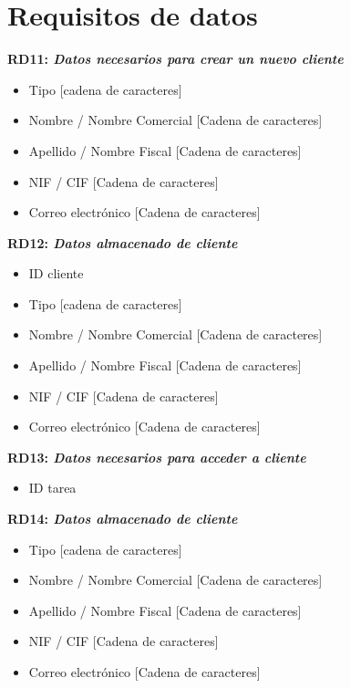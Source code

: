 \documentclass[paper=a4, fontsize=11pt, spanish]{scrartcl}
\begin{document}
\section{Requisitos de datos}
\setlength{\parindent}{0em}
\textbf{RD11: \textit{ Datos necesarios para crear un nuevo cliente}}
\setlength{\parindent}{2em}
\begin{itemize}

	\item Tipo [cadena de caracteres]
	
	\item Nombre / Nombre Comercial [Cadena de caracteres]
	
	\item Apellido / Nombre Fiscal [Cadena de caracteres]
	
	\item NIF / CIF [Cadena de caracteres]
	
	\item Correo electrónico [Cadena de caracteres]

\end{itemize}
\setlength{\parindent}{0em}
\textbf{RD12: \textit{Datos almacenado de cliente}}
\setlength{\parindent}{2em}
\begin{itemize}
	\item ID cliente
	
	\item Tipo [cadena de caracteres]
	
	\item Nombre / Nombre Comercial [Cadena de caracteres]
	
	\item Apellido / Nombre Fiscal [Cadena de caracteres]
	
	\item NIF / CIF [Cadena de caracteres]
	
	\item Correo electrónico [Cadena de caracteres]
\end{itemize}

\setlength{\parindent}{0em}
\textbf{RD13: \textit{Datos necesarios para acceder a cliente}}
\setlength{\parindent}{2em}
\begin{itemize}
	\item ID tarea
\end{itemize}

\setlength{\parindent}{0em}
\textbf{RD14: \textit{Datos almacenado de cliente}}
\setlength{\parindent}{2em}
\begin{itemize}
	
	\item Tipo [cadena de caracteres]
	
	\item Nombre / Nombre Comercial [Cadena de caracteres]
	
	\item Apellido / Nombre Fiscal [Cadena de caracteres]
	
	\item NIF / CIF [Cadena de caracteres]
	
	\item Correo electrónico [Cadena de caracteres]
\end{itemize}
\end{document}
